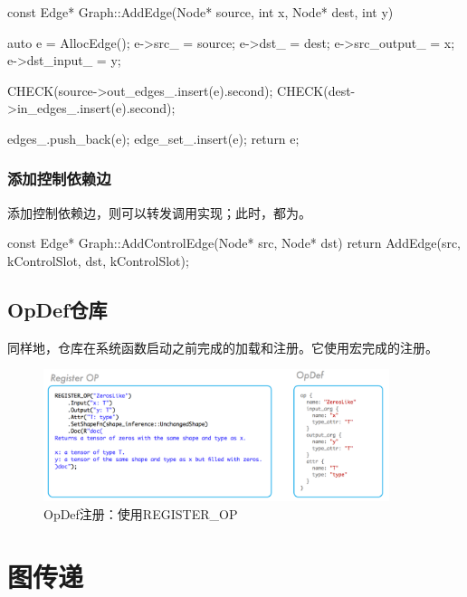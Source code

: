 \begin{content}
\begin{leftbar}
\begin{c++}
const Edge* Graph::AddEdge(Node* source, int x, Node* dest, int y) {
  auto e = AllocEdge();
  e->src_ = source;
  e->dst_ = dest;
  e->src_output_ = x;
  e->dst_input_ = y;

  CHECK(source->out_edges_.insert(e).second);
  CHECK(dest->in_edges_.insert(e).second);

  edges_.push_back(e);
  edge_set_.insert(e);
  return e;
}
\end{c++}
\end{leftbar}

\subsubsection{添加控制依赖边}

添加控制依赖边，则可以转发调用实现；此时，都为。

\begin{leftbar}
\begin{c++}
const Edge* Graph::AddControlEdge(Node* src, Node* dst) {
  return AddEdge(src, kControlSlot, dst, kControlSlot);
}
\end{c++}
\end{leftbar}

\subsection{OpDef仓库}

同样地，仓库在系统函数启动之前完成的加载和注册。它使用宏完成的注册。

\begin{figure}[!htbp]
\centering
\includegraphics[width=0.9\textwidth]{figures/cc-op-repo.png}
\caption{OpDef注册：使用REGISTER\_OP}
 \label{fig:cc-op-repo}
\end{figure}

\end{content}

\section{图传递}

